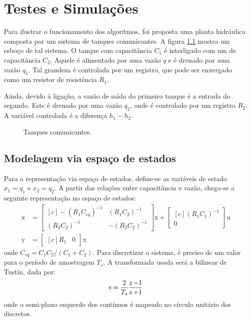 \chapter{Testes e Simulações}

Para ilustrar o funcionamento dos algoritmos, foi proposta uma planta hidráulica composta por um sistema de tanques comunicantes. A figura \ref{fig:TanquesComunicantes} mostra um esboço de tal sistema. O tanque com capacitância $C_1$ é interligado com um de capacitância $C_2$. Aquele é alimentado por uma vazão $q$ e é drenado por uma vazão $q_1$. Tal grandeza é controlada por um registro, que pode ser enxergado como um resistor de resistência $R_1$.

Ainda, devido à ligação, a vazão de saída do primeiro tanque é a entrada do segundo. Este é drenado por uma vazão $q_2$, onde é controlado por um registro $R_2$. A variável controlada é a diferença $h_1 - h_2$.

\begin{figure}[!ht]
\centering

\caption{Tanques comunicantes.}
\label{fig:TanquesComunicantes}
\end{figure}

\section{Modelagem via espaço de estados}
Para a representação via espaço de estados, define-se as variáveis de estado $x_1 = q_1$ e $x_2 = q_2$. A partir das relações entre capacitância e vazão, chega-se a seguinte representação no espaço de estados:
\begin{subequations}
\begin{align}
\dot{\pmb{\mathrm{x}}} &= \begin{bmatrix*}[c]
-(R_1C_{eq})^{-1} & (R_1C_2)^{-1}\\
(R_2C_2)^{-1} & -(R_2C_2)^{-1}
\end{bmatrix*}\pmb{\mathrm{x}} + \begin{bmatrix*}[c]
(R_1C_1)^{-1}\\
0
\end{bmatrix*}\pmb{\mathrm{u}}\label{eq:SSTCEntrada}\\
\pmb{\mathrm{y}} &= \begin{bmatrix*}[c]
R_1 & 0
\end{bmatrix*}\pmb{\mathrm{x}}\label{eq:SSTCSaida}
\end{align}
\end{subequations}
onde $C_{eq} = C_1C_2/(C_1 + C_2)$. Para discretizar o sistema, é preciso de um valor para o período de amostragem $T_s$. A transformada usada será a bilinear de Tustin, dada por:
\begin{equation}
\operatorname{\mathrm{s}} = \dfrac{2}{T_s}\dfrac{\operatorname{\mathrm{z}}-1}{\operatorname{\mathrm{z}}+1}\label{eq:BilinearTransform}
\end{equation}
onde o semi-plano esquerdo dos contínuos é mapeado no círculo unitário dos discretos.

